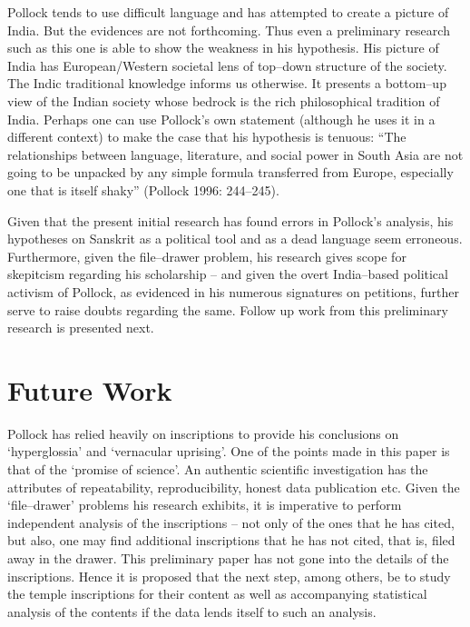 Pollock tends to use difficult language and has attempted to create a picture of India. But the evidences are not forthcoming. Thus even a preliminary research such as this one is able to show the weakness in his hypothesis. His picture of India has European/Western societal lens of top–down structure of the society. The Indic traditional knowledge informs us otherwise. It presents a bottom–up view of the Indian society whose bedrock is the rich philosophical tradition of India. Perhaps one can use Pollock’s own statement (although he uses it in a different context) to make the case that his hypothesis is tenuous: “The relationships between language, literature, and social power in South Asia are not going to be unpacked by any simple formula transferred from Europe, especially one that is itself shaky” (Pollock 1996: 244–245).

Given that the present initial research has found errors in Pollock’s analysis, his hypotheses on Sanskrit as a political tool and as a dead language seem erroneous. Furthermore, given the file–drawer problem, his research gives scope for skepitcism regarding his scholarship – and given the overt India–based political activism of Pollock, as evidenced in his numerous signatures on petitions, further serve to raise doubts regarding the same. Follow up work from this preliminary research is presented next.


\section*{Future Work}

\item Pollock has relied heavily on inscriptions to provide his conclusions on ‘hyperglossia’ and ‘vernacular uprising’. One of the points made in this paper is that of the ‘promise of science’. An authentic scientific investigation has the attributes of repeatability, reproducibility, honest data publication etc. Given the ‘file–drawer’ problems his research exhibits, it is imperative to perform independent analysis of the inscriptions – not only of the ones that he has cited, but also, one may find additional inscriptions that he has not cited, that is, filed away in the drawer. This preliminary paper has not gone into the details of the inscriptions. Hence it is proposed that the next step, among others, be to study the temple inscriptions for their content as well as accompanying statistical analysis of the contents if the data lends itself to such an analysis.

